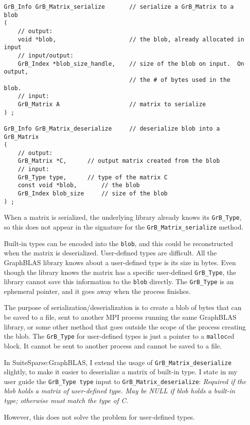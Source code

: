 \documentclass[12pt]{article}
\begin{document}
{\footnotesize
\begin{verbatim}
GrB_Info GrB_Matrix_serialize       // serialize a GrB_Matrix to a blob
(
    // output:
    void *blob,                     // the blob, already allocated in input
    // input/output:
    GrB_Index *blob_size_handle,    // size of the blob on input.  On output,
                                    // the # of bytes used in the blob.
    // input:
    GrB_Matrix A                    // matrix to serialize
) ;

GrB_Info GrB_Matrix_deserialize     // deserialize blob into a GrB_Matrix
(
    // output:
    GrB_Matrix *C,      // output matrix created from the blob
    // input:
    GrB_Type type,      // type of the matrix C
    const void *blob,       // the blob
    GrB_Index blob_size     // size of the blob
) ;
\end{verbatim}}

When a matrix is serialized, the underlying library already knows its
\verb'GrB_Type', so this does not appear in the signature for
the \verb'GrB_Matrix_serialize' method.

Built-in types can be encoded into the \verb'blob', and this could be
reconstructed when the matrix is deserialized.
User-defined types are difficult.  All the GraphBLAS library knows about
a user-defined type is its size in bytes.  Even though the library knows the
matrix has a specific user-defined \verb'GrB_Type', the library cannot save
this information to the \verb'blob' directly.  The \verb'GrB_Type' is an
ephemeral pointer, and it goes away when the process finishes.

The purpose of serialization/deserialization is to create a blob of bytes that
can be saved to a file, sent to another MPI process  running the same GraphBLAS
library, or some other method that goes outside the scope of the process
creating the blob.  The \verb'GrB_Type' for user-defined types is just a
pointer to a \verb'malloc'ed block.  It cannot be sent to another process and
cannot be saved to a file.

In SuiteSparse:GraphBLAS, I extend the usage of \verb'GrB_Matrix_deserialize'
slightly, to make it easier to deserialize a matrix of built-in type.
I state in my user guide the \verb'GrB_Type type' input to 
\verb'GrB_Matrix_deserialize':
    {\em Required if the blob holds a matrix of user-defined type.  May be NULL
    if blob holds a built-in type; otherwise must match the type of C.}

However, this does not solve the problem for user-defined types.
\end{document}
